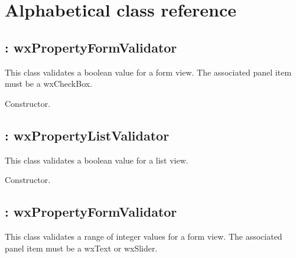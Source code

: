 \chapter{Alphabetical class reference}\label{classref}
%
\setfooter{\thepage}{}{}{}{}{\thepage}%



\section{: wxPropertyFormValidator}\label{wxboolformvalidator}


This class validates a boolean value for a form view. The associated panel item must be a wxCheckBox.



Constructor.

\section{: wxPropertyListValidator}\label{wxboollistvalidator}


This class validates a boolean value for a list view.



Constructor.

\section{: wxPropertyFormValidator}\label{wxintegerformvalidator}


This class validates a range of integer values for a form view. The associated panel item must be a wxText
or wxSlider.


